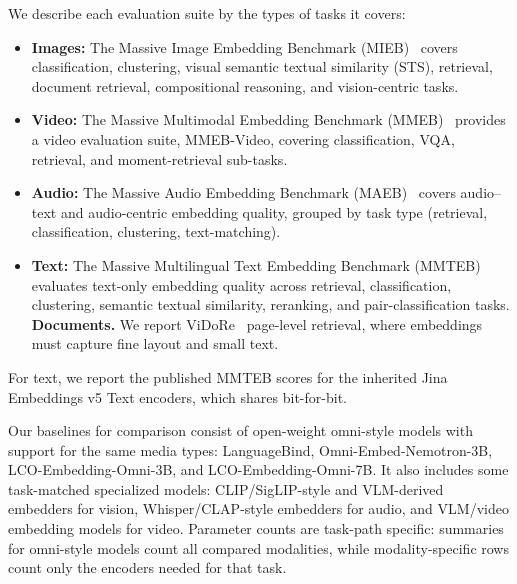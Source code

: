 \label{sec:experiments:benchmarks}

We describe each evaluation suite by the types of tasks it covers:
\begin{itemize}
    \item \textbf{Images:} The Massive Image Embedding Benchmark (MIEB)~\cite{mieb} covers classification, clustering, visual semantic textual similarity (STS), retrieval, document retrieval, compositional reasoning, and vision-centric tasks.
    \item \textbf{Video:} The Massive Multimodal Embedding Benchmark (MMEB)~\cite{mmeb} provides a video evaluation suite, MMEB-Video, covering classification, VQA, retrieval, and moment-retrieval sub-tasks.
    \item \textbf{Audio:} The Massive Audio Embedding Benchmark (MAEB)~\cite{maeb} covers audio--text and audio-centric embedding quality, grouped by task type (retrieval, classification, clustering, text-matching).
    \item \textbf{Text:} The Massive Multilingual Text Embedding Benchmark (MMTEB)~\cite{mteb} evaluates text-only embedding quality across retrieval, classification, clustering, semantic textual similarity, reranking, and pair-classification tasks.
\textbf{Documents.} We report ViDoRe~\cite{vidore} page-level retrieval, where embeddings must capture fine layout and small text.
\end{itemize}

For text, we report the published MMTEB scores for the inherited Jina Embeddings v5 Text encoders, which \omniBase{} shares bit-for-bit.~\cite{jina-v5-text}

Our baselines for comparison consist of open-weight omni-style models with support for the same media types: LanguageBind, Omni-Embed-Nemotron-3B, LCO-Embedding-Omni-3B, and LCO-Embedding-Omni-7B. 
It also includes some task-matched specialized models: CLIP/SigLIP-style and VLM-derived embedders for vision, Whisper/CLAP-style embedders for audio, and VLM/video embedding models for video.
Parameter counts are task-path specific: summaries for omni-style models count all compared modalities, while modality-specific rows count only the encoders needed for that task.

